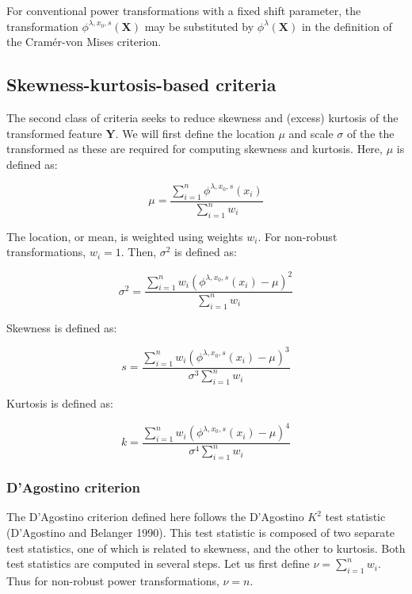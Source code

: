 \documentclass[
  a4paper,
]{article}
\begin{document}
For conventional power transformations with a fixed shift parameter, the
transformation \(\phi^{\lambda, x_0, s} (\mathbf{X})\) may be
substituted by \(\phi^{\lambda} (\mathbf{X})\) in the definition of the
Cramér-von Mises criterion.

\subsection{Skewness-kurtosis-based
criteria}\label{skewness-kurtosis-based-criteria}

The second class of criteria seeks to reduce skewness and (excess)
kurtosis of the transformed feature \(\mathbf{Y}\). We will first define
the location \(\mu\) and scale \(\sigma\) of the the transformed as
these are required for computing skewness and kurtosis. Here, \(\mu\) is
defined as:

\begin{equation}
\mu = \frac{\sum_{i=1}^n \phi^{\lambda, x_0, s} \left(x_i \right)} {\sum_{i=1}^n w_i}
\end{equation}

The location, or mean, is weighted using weights \(w_i\). For non-robust
transformations, \(w_i = 1\). Then, \(\sigma^2\) is defined as:

\begin{equation}
\sigma^2 = \frac{\sum_{i=1}^n w_i \left(\phi^{\lambda, x_0, s} \left( x_i \right) - \mu \right)^2}{\sum_{i=1}^n w_i}
\end{equation}

Skewness is defined as:

\begin{equation}
s = \frac{\sum_{i=1}^n w_i \left(\phi^{\lambda, x_0, s} \left( x_i \right) - \mu \right)^3}{\sigma^3 \sum_{i=1}^n w_i}
\end{equation}

Kurtosis is defined as:

\begin{equation}
k = \frac{\sum_{i=1}^n w_i \left(\phi^{\lambda, x_0, s} \left( x_i \right) - \mu \right)^4}{\sigma^4 \sum_{i=1}^n w_i}
\end{equation}

\subsubsection{D'Agostino criterion}\label{dagostino-criterion}

The D'Agostino criterion defined here follows the D'Agostino \(K^2\)
test statistic (D'Agostino and Belanger 1990). This test statistic is
composed of two separate test statistics, one of which is related to
skewness, and the other to kurtosis. Both test statistics are computed
in several steps. Let us first define \(\nu=\sum_{i=1}^n w_i\). Thus for
non-robust power transformations, \(\nu = n\).
\end{document}
